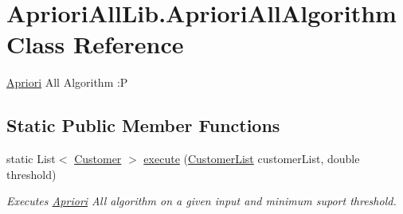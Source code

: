 \hypertarget{class_apriori_all_lib_1_1_apriori_all_algorithm}{\section{Apriori\-All\-Lib.\-Apriori\-All\-Algorithm Class Reference}
\label{class_apriori_all_lib_1_1_apriori_all_algorithm}
}


\hyperlink{class_apriori_all_lib_1_1_apriori}{Apriori} All Algorithm \-:P  


\subsection*{Static Public Member Functions}
\begin{DoxyCompactItemize}
\item 
static List$<$ \hyperlink{class_apriori_all_lib_1_1_customer}{Customer} $>$ \hyperlink{class_apriori_all_lib_1_1_apriori_all_algorithm_ae4f86f8c88052d29cbfc629f2f61c302}{execute} (\hyperlink{class_apriori_all_lib_1_1_customer_list}{Customer\-List} customer\-List, double threshold)
\begin{DoxyCompactList}\small\item\em Executes \hyperlink{class_apriori_all_lib_1_1_apriori}{Apriori} All algorithm on a given input and minimum suport threshold. \end{DoxyCompactList}\end{DoxyCompactItemize}
